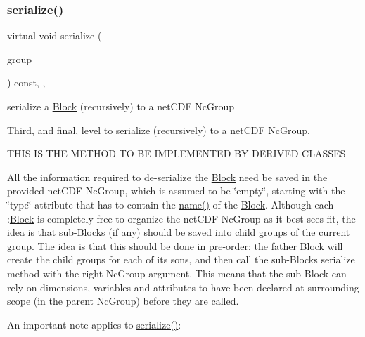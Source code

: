 \subsubsection{\texorpdfstring{serialize()}{serialize()}}
{\footnotesize\ttfamily virtual void serialize (\begin{DoxyParamCaption}\item[{net\+C\+D\+F\+::\+Nc\+Group \&\&}]{group }\end{DoxyParamCaption}) const\hspace{0.3cm}{\ttfamily [override]}, {\ttfamily [protected]}, {\ttfamily [virtual]}}



serialize a \mbox{\hyperlink{class_s_m_spp__di__unipi__it_1_1_block}{Block}} (recursively) to a net\+C\+DF Nc\+Group 

Third, and final, level to serialize (recursively) to a net\+C\+DF Nc\+Group. \begin{DoxyVerb}THIS IS THE METHOD TO BE IMPLEMENTED BY DERIVED CLASSES
\end{DoxyVerb}


All the information required to de-\/serialize the \mbox{\hyperlink{class_s_m_spp__di__unipi__it_1_1_block}{Block}} need be saved in the provided net\+C\+DF Nc\+Group, which is assumed to be \char`\"{}empty\char`\"{}, starting with the \char`\"{}type\char`\"{} attribute that has to contain the \mbox{\hyperlink{class_s_m_spp__di__unipi__it_1_1_block_a738e9dfd6e00507da219e4bd5a3f6be9}{name()}} of the \mbox{\hyperlink{class_s_m_spp__di__unipi__it_1_1_block}{Block}}. Although each \+:\mbox{\hyperlink{class_s_m_spp__di__unipi__it_1_1_block}{Block}} is completely free to organize the net\+C\+DF Nc\+Group as it best sees fit, the idea is that sub-\/\+Blocks (if any) should be saved into child groups of the current group. The idea is that this should be done in pre-\/order\+: the father \mbox{\hyperlink{class_s_m_spp__di__unipi__it_1_1_block}{Block}} will create the child groups for each of its sons, and then call the sub-\/\+Block\textquotesingle{}s serialize method with the right Nc\+Group argument. This means that the sub-\/\+Block can rely on dimensions, variables and attributes to have been declared at surrounding scope (in the parent Nc\+Group) before they are called.

An important note applies to \mbox{\hyperlink{class_s_m_spp__di__unipi__it_1_1_simple_m_i_l_p_block_aefb3f33afdab2b6f4aef3f926c10df51}{serialize()}}\+:


